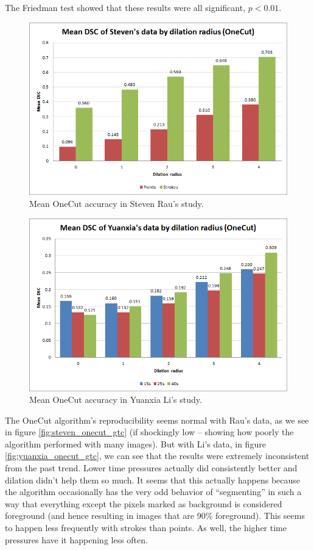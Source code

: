 \documentclass[12pt,a4paper,notitlepage]{article}
\begin{document}
The Friedman test showed that these results were all significant, $p < 0.01$.

\begin{figure}[H]
	\includegraphics[width=.9\linewidth]{steven_onecut_dsc}
	\caption{Mean OneCut accuracy in Steven Rau's study.}
	\label{fig:steven_onecut_dsc}
\end{figure}

\begin{figure}[H]
	\includegraphics[width=.9\linewidth]{yuanxia_onecut_dsc}
	\caption{Mean OneCut accuracy in Yuanxia Li's study.}
	\label{fig:yuanxia_onecut_dsc}
\end{figure}

The OneCut algorithm's reproducibility seems normal with Rau's data, as we see in figure \ref{fig:steven_onecut_gtc} (if shockingly low -- showing how poorly the algorithm performed with many images). But with Li's data, in figure \ref{fig:yuanxia_onecut_gtc}, we can see that the results were extremely inconsistent from the past trend. Lower time pressures actually did consistently better and dilation didn't help them so much. It seems that this actually happens because the algorithm occasionally has the very odd behavior of ``segmenting'' in such a way that everything except the pixels marked as background is considered foreground (and hence resulting in images that are 90\% foreground). This seems to happen less frequently with strokes than points. As well, the higher time pressures have it happening less often.
\end{document}
